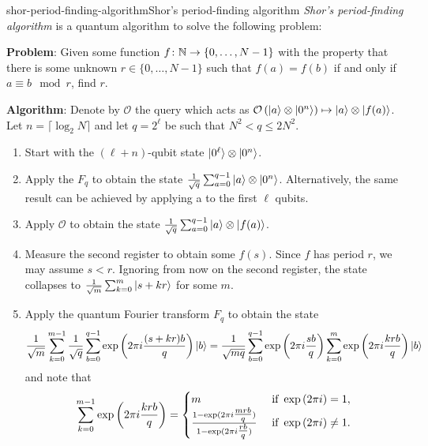 \begin{topic}{shor-period-finding-algorithm}{Shor's period-finding algorithm}
    \emph{Shor's period-finding algorithm} is a quantum algorithm to solve the following problem:

    \textbf{Problem}: Given some function $f \colon \mathbb{N} \to \{ 0, \ldots, N - 1 \}$ with the property that there is some unknown $r \in \{ 0, \ldots, N - 1 \}$ such that $f(a) = f(b)$ if and only if $a \equiv b \mod r$, find $r$.

    \textbf{Algorithm}: Denote by $\mathcal{O}$ the query which acts as $\mathcal{O} \left( |a\rangle \otimes |0^n\rangle \right) \mapsto |a\rangle \otimes |f(a)\rangle$. Let $n = \lceil \log_2 N \rceil$ and let $q = 2^\ell$ be such that $N^2 < q \le 2 N^2$.
    \begin{enumerate}[label=(\arabic*)]
        \item Start with the $(\ell + n)$-qubit state $|0^\ell\rangle \otimes |0^n\rangle$.
        \item Apply the  $F_q$ to obtain the state $\frac{1}{\sqrt{q}} \sum_{a = 0}^{q - 1} |a\rangle \otimes |0^n\rangle$. Alternatively, the same result can be achieved by applying a  to the first $\ell$ qubits.
        \item Apply $\mathcal{O}$ to obtain the state $\frac{1}{\sqrt{q}} \sum_{a = 0}^{q - 1} |a\rangle \otimes |f(a)\rangle$.
        \item Measure the second register to obtain some $f(s)$. Since $f$ has period $r$, we may assume $s < r$. Ignoring from now on the second register, the state collapses to $\frac{1}{\sqrt{m}} \sum_{k = 0}^{m} |s + kr\rangle$ for some $m$.
        \item Apply the quantum Fourier transform $F_q$ to obtain the state
        \[ \frac{1}{\sqrt{m}} \sum_{k = 0}^{m - 1} \frac{1}{\sqrt{q}} \sum_{b = 0}^{q - 1} \exp \left( 2 \pi i \frac{(s + kr) b}{q} \right) |b\rangle = \frac{1}{\sqrt{mq}} \sum_{b = 0}^{q - 1} \exp \left( 2 \pi i \frac{sb}{q} \right) \sum_{k = 0}^{m} \exp \left( 2 \pi i \frac{krb}{q} \right) |b\rangle \]
        and note that
        \[ \sum_{k = 0}^{m - 1} \exp \left( 2 \pi i \frac{krb}{q} \right) = \begin{cases}
            m & \textup{ if } \exp \left( 2 \pi i \right) = 1 , \\
            \frac{1 - \exp(2 \pi i \tfrac{mrb}{q})}{1 - \exp(2 \pi i \tfrac{rb}{q})} & \textup{ if } \exp \left( 2 \pi i \right) \ne 1 . \\

\end{cases}\]
\end{enumerate}
\end{topic}
